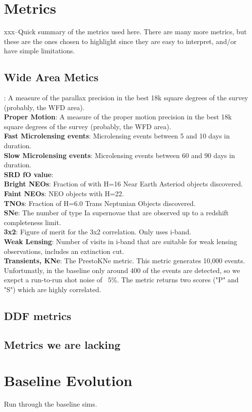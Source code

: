 \section{Metrics}


xxx--Quick summary of the metrics used here. There are many more metrics, but these are the ones chosen to highlight since they are easy to interpret, and/or have simple limitations.



\subsection{Wide Area Metics}

: A measure of the parallax precision in the best 18k square degrees of the survey (probably, the WFD area).  \\
{\bf Proper Motion}: A measure of the proper motion precision in the best 18k square degrees of the survey (probably, the WFD area). \\
{\bf Fast Microlensing events}: Microlensing events between 5 and 10 days in duration. \\
{\bf Slow Microlensing events}: Microlensing events between 60 and 90 days in duration.\\
{\bf SRD fO value}: \\
{\bf Bright NEOs}: Fraction of with H=16 Near Earth Asteriod objects discovered. \\
{\bf Faint NEOs}: NEO objects with H=22. \\
{\bf TNOs}: Fraction of H=6.0 Trans Neptunian Objects discovered.  \\
{\bf SNe}: The number of type Ia supernovae that are observed up to a redshift completeness limit. \\
{\bf 3x2}: Figure of merit for the 3x2 correlation. Only uses i-band. \\
{\bf Weak Lensing}: Number of visits in i-band that are suitable for weak lensing observations, includes an extinction cut. \\
{\bf Transients, KNe}: The PrestoKNe metric. This metric generates 10,000 events. Unfortunatly, in the baseline only around 400 of the events are detected, so we exepct a run-to-run shot noise of ~5\%. The metric returns two scores ("P" and "S") which are highly correlated.  \\


\subsection{DDF metrics}


\subsection{Metrics we are lacking}



\begin{figure}
\caption{\label{baseline2_radar}}
\end{figure}

\section{Baseline Evolution}

Run through the baseline sims. 


